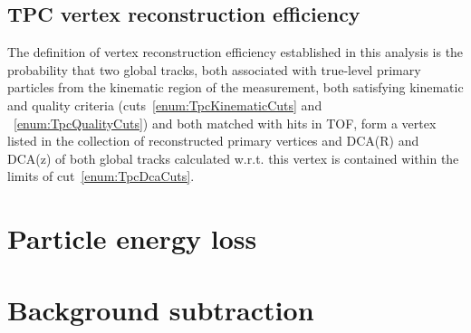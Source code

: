 \subsection{TPC vertex reconstruction efficiency}\label{sec:tpcVxRecoEff}

The definition of vertex reconstruction efficiency established in this analysis is the probability that two global tracks, both associated with true-level primary particles from the kinematic region of the measurement, both satisfying kinematic and quality criteria (cuts~\ref{enum:TpcKinematicCuts} and ~\ref{enum:TpcQualityCuts}) and both matched with hits in TOF, form a vertex listed in the collection of reconstructed primary vertices and DCA(R) and DCA(z) of both global tracks calculated w.r.t. this vertex is contained within the limits of cut~\ref{enum:TpcDcaCuts}.

\section{Particle energy loss}\label{sec:energyLoss}
\section{Background subtraction}\label{sec:bkgdSubtraction}

% 
% 
% 
% 
% 
% 
% 
% 
